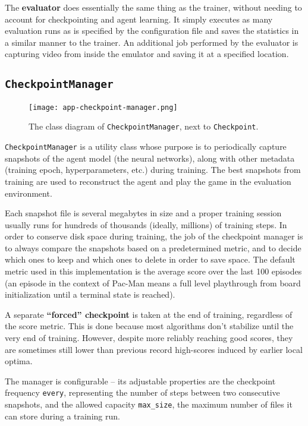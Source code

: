 The \textbf{evaluator} does essentially the same thing as the trainer, without needing to account for checkpointing and agent learning.
It simply executes as many evaluation runs as is specified by the configuration file and saves the statistics in a similar manner to the trainer.
An additional job performed by the evaluator is capturing video from inside the emulator and saving it at a specified location.

\subsection{\texttt{CheckpointManager}}

\begin{figure}[ht]
    \centering
    \texttt{[image: app-checkpoint-manager.png]}
    \caption{The class diagram of \texttt{CheckpointManager}, next to \texttt{Checkpoint}.}
    \label{fig:checkpoint-manager}
\end{figure}

\texttt{CheckpointManager} is a utility class whose purpose is to periodically capture snapshots of the agent model (the neural networks), along with other metadata (training epoch, hyperparameters, etc.) during training.
The best snapshots from training are used to reconstruct the agent and play the game in the evaluation environment.

Each snapshot file is several megabytes in size and a proper training session usually runs for hundreds of thousands (ideally, millions) of training steps.
In order to conserve disk space during training, the job of the checkpoint manager is to always compare the snapshots based on a predetermined metric, and to decide which ones to keep and which ones to delete in order to save space.
The default metric used in this implementation is the average score over the last 100 episodes (an episode in the context of Pac-Man means a full level playthrough from board initialization until a terminal state is reached).

A separate \textbf{``forced'' checkpoint} is taken at the end of training, regardless of the score metric.
This is done because most algorithms don’t stabilize until the very end of training.
However, despite more reliably reaching good scores, they are sometimes still lower than previous record high-scores induced by earlier local optima.

The manager is configurable -- its adjustable properties are the checkpoint frequency \texttt{every}, 
representing the number of steps between two consecutive snapshots, and the allowed capacity
\verb|max_size|, the maximum number of files it can store during a training run.

